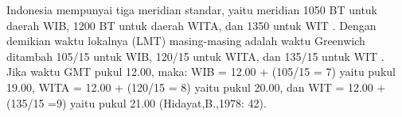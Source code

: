 Indonesia mempunyai tiga meridian standar, yaitu meridian 1050 BT untuk daerah WIB, 
 1200 BT untuk daerah WITA, dan 1350 untuk WIT .  Dengan demikian waktu lokalnya (LMT) 
 masing-masing adalah waktu Greenwich 
 ditambah 105/15 untuk WIB, 120/15 untuk WITA, dan 135/15 untuk WIT .
 Jika waktu GMT pukul 12.00, maka: WIB = 12.00 + (105/15 = 7) yaitu pukul 19.00,
 WITA = 12.00 + (120/15 = 8) yaitu pukul 20.00, 
 dan WIT = 12.00 + (135/15 =9) yaitu pukul 21.00 (Hidayat,B.,1978: 42).
